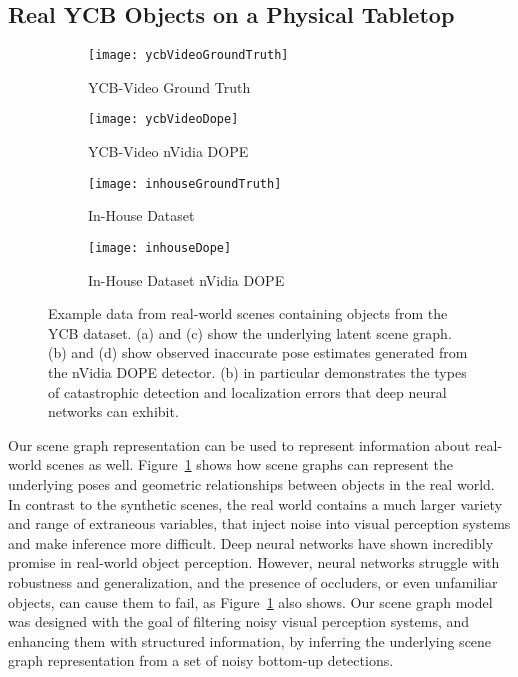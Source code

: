 \subsection{Real YCB Objects on a Physical Tabletop}
\begin{figure}[H]
  \begin{subfigure}[b]{0.45\textwidth}
    \centering
    \texttt{[image: ycbVideoGroundTruth]}
    \caption{
      YCB-Video Ground Truth
    }
  \end{subfigure}%
  \begin{subfigure}[b]{0.45\textwidth}
    \centering
    \texttt{[image: ycbVideoDope]}
    \caption{
      YCB-Video nVidia DOPE
    }
  \end{subfigure}
  \begin{subfigure}[b]{0.45\textwidth}
    \centering
    \texttt{[image: inhouseGroundTruth]}
    \caption{
      In-House Dataset
    }
  \end{subfigure}%
  \begin{subfigure}[b]{0.45\textwidth}
    \centering
    \texttt{[image: inhouseDope]}
    \caption{
      In-House Dataset nVidia DOPE
    }
  \end{subfigure}
  \caption{
    Example data from real-world scenes containing objects from the YCB dataset.
    (a) and (c) show the underlying latent scene graph.
    (b) and (d) show observed inaccurate pose estimates generated from the nVidia DOPE detector. (b) in particular demonstrates the types of catastrophic detection and localization errors that deep neural networks can exhibit.
  }
  \label{fig:realWorldSceneGraphs}
\end{figure}

Our scene graph representation can be used to represent information about real-world scenes as well.
Figure~\ref{fig:realWorldSceneGraphs} shows how scene graphs can represent the underlying poses and geometric relationships between objects in the real world.
In contrast to the synthetic scenes, the real world contains a much larger variety and range of extraneous variables, that inject noise into visual perception systems and make inference more difficult.
Deep neural networks have shown incredibly promise in real-world object perception.
However, neural networks struggle with robustness and generalization, and the presence of occluders, or even unfamiliar objects, can cause them to fail, as Figure~\ref{fig:realWorldSceneGraphs} also shows.
Our scene graph model was designed with the goal of filtering noisy visual perception systems, and enhancing them with structured information, by inferring the underlying scene graph representation from a set of noisy bottom-up detections.
